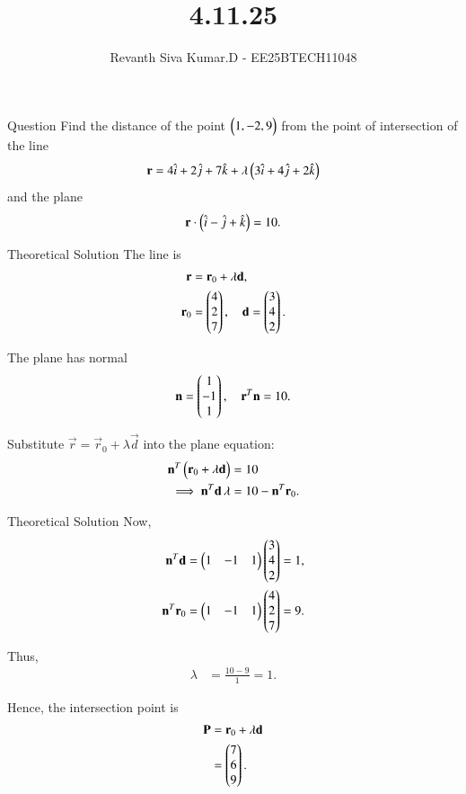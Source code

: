 \documentclass{beamer}
\title %
{4.11.25}
\author %
{Revanth Siva Kumar.D - EE25BTECH11048}
\begin{document}
	
	\frame{\titlepage}
	\begin{frame}{Question}
			Find the distance of the point $\begin{pmatrix}1,-2,9\end{pmatrix}$ from the point of intersection of the line
\[
\mathbf{r} = 4\hat{i} + 2\hat{j} + 7\hat{k} + \lambda \begin{pmatrix}3\hat{i} + 4\hat{j} + 2\hat{k}\end{pmatrix}
\]
and the plane
\[
\mathbf{r}\cdot\begin{pmatrix}\hat{i} - \hat{j} + \hat{k}\end{pmatrix} = 10.
\]
	\end{frame}
	
	
	\begin{frame}{Theoretical Solution}
			The line is
\begin{align}
    \mathbf{r} &= \mathbf{r}_0 + \lambda \mathbf{d}, \\
    \mathbf{r}_0 &= \begin{pmatrix}4 \\ 2 \\ 7\end{pmatrix}, \quad
    \mathbf{d} = \begin{pmatrix}3 \\ 4 \\ 2\end{pmatrix}.
\end{align}

The plane has normal
\begin{align}
    \mathbf{n} = \begin{pmatrix}1 \\ -1 \\ 1\end{pmatrix}, \quad \mathbf{r}^T \mathbf{n} = 10.
\end{align}

Substitute $\vec{r} = \vec{r}_0 + \lambda \vec{d}$ into the plane equation:
\begin{align}
    \mathbf{n}^T\begin{pmatrix}\mathbf{r}_0 + \lambda \mathbf{d}\end{pmatrix} &= 10 \\
    \implies \mathbf{n}^T\mathbf{d}\,\lambda &= 10 - \mathbf{n}^T\mathbf{r}_0.
\end{align}
\end{frame}
\begin{frame}{Theoretical Solution}
Now,
\begin{align}
    \mathbf{n}^T\mathbf{d} &= \begin{pmatrix}1 & -1 & 1\end{pmatrix}\begin{pmatrix}3 \\ 4 \\ 2\end{pmatrix} = 1, \\
    \mathbf{n}^T\mathbf{r}_0 &= \begin{pmatrix}1 & -1 & 1\end{pmatrix}\begin{pmatrix}4 \\ 2 \\ 7\end{pmatrix} = 9.
\end{align}

Thus,
\begin{align}
    \lambda &= \frac{10-9}{1} = 1.
\end{align}

Hence, the intersection point is
\begin{align}
    \mathbf{P} &= \mathbf{r}_0 + \lambda \mathbf{d} \\
     &= \begin{pmatrix}7 \\ 6 \\ 9\end{pmatrix}.
\end{align}
\end{frame}
\end{document}
